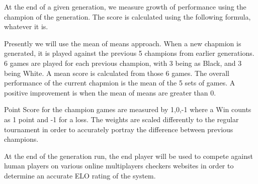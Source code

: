 \documentclass[12pt,a4paper]{article}
\begin{document}
At the end of a given generation, we measure growth of performance using the champion of the generation. The score is calculated using the following formula, whatever it is.

Presently we will use the mean of means approach. When a new chapmion is generated, it is played against the previous 5 champions from earlier generations. 6 games are played for each previous champion, with 3 being as Black, and 3 being White. A mean score is calculated from those 6 games. The overall performance of the current chapmion is the mean of the 5 sets of games. A positive improvement is when the mean of means are greater than 0. 

Point Score for the champion games are measured by {1,0,-1} where a Win counts as 1 point and -1 for a loss. The weights are scaled differently to the regular tournament in order to accurately portray the difference between previous champions.

At the end of the generation run, the end player will be used to compete against human players on various online multiplayers checkers websites in order to determine an accurate ELO rating of the system.



\end{document}
